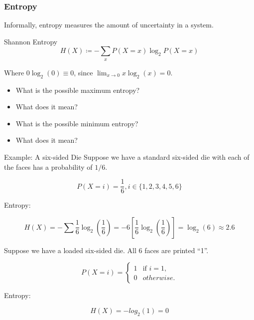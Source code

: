 \documentclass[aspectratio=169, 10pt]{beamer}
\begin{document}
\begin{frame}
\frametitle{Entropy}

Informally, entropy measures the amount of uncertainty in a system.

\begin{block}{Shannon Entropy}
    \[
        H(X) \coloneqq - \sum_x P(X=x) \log_2 P(X=x)
    \]
\end{block}
Where $0 \log_2(0) \equiv 0$, since $\lim_{x \to 0} x \log_2(x)=0$.

\begin{itemize}
    \item<1-> What is the possible maximum entropy?
    \item<1-> What does it mean?
    \item<1-> What is the possible minimum entropy?
    \item<1-> What does it mean?
\end{itemize}

\end{frame}

\begin{frame}{Example: A six-sided Die}
\small
Suppose we have a standard six-sided die with each of the faces has a probability of $1/6$.

\[
    P(X=i) = \frac{1}{6}, i \in \{1,2,3,4,5,6\}
\]

Entropy:

\[
    H(X) = - \sum \frac{1}{6} \log_2 (\frac{1}{6}) = -6[\frac{1}{6} \log_2(\frac{1}{6})] = \log_2(6) \approx 2.6
\]

Suppose we have a loaded six-sided die. All 6 faces are printed ``1''.

\[ P(X=i)= 
    \begin{cases} 
        1 & \text{if } i = 1, \\
        0 & otherwise. 
    \end{cases}
\]

Entropy:

\[
    H(X) = - log_2(1) = 0
\]

\end{frame}
\end{document}
